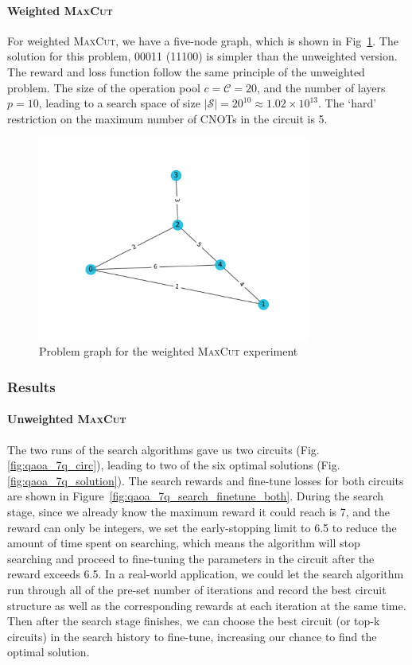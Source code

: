\documentclass[a4paper,onecolumn,11pt]{quantumarticle}
\begin{document}
\paragraph{Weighted \textsc{MaxCut}} For weighted \textsc{MaxCut}, we have a five-node graph, which is shown in Fig~\ref{fig:max_cut_weighted_prob}. The solution for this problem, 00011 (11100) is simpler than the unweighted version. The reward and loss function follow the same principle of the unweighted problem. The size of the operation pool $c = \mathcal{C} = 20$, and the number of layers $p = 10$, leading to a search space of size $\vert \mathcal{S} \vert = 20^{10} \approx 1.02\times 10^{13}$. The `hard' restriction on the maximum number of CNOTs in the circuit is 5.

\begin{figure}[H]
  \centering
  \includegraphics[width=0.8\textwidth]{Figures/fig_max_cut_weighted_5q.pdf}
  \caption{Problem graph for the weighted \textsc{MaxCut} experiment}
  \label{fig:max_cut_weighted_prob}
\end{figure}



\subsubsection{Results}
\paragraph{Unweighted \textsc{MaxCut}}
The two runs of the search algorithms gave us two circuits (Fig. \ref{fig:qaoa_7q_circ}), leading to two of the six optimal solutions (Fig. \ref{fig:qaoa_7q_solution}). The search rewards and fine-tune losses for both circuits are shown in Figure~\ref{fig:qaoa_7q_search_finetune_both}. During the search stage, since we already know the maximum reward it could reach is 7, and the reward can only be integers, we set the early-stopping limit to 6.5 to reduce the amount of time spent on searching, which means the algorithm will stop searching and proceed to fine-tuning the parameters in the circuit after the reward exceeds 6.5. In a real-world application, we could let the search algorithm run through all of the pre-set number of iterations and record the best circuit structure as well as the corresponding rewards at each iteration at the same time. Then after the search stage finishes, we can choose the best circuit (or top-k circuits) in the search history to fine-tune, increasing our chance to find the optimal solution.
\end{document}
